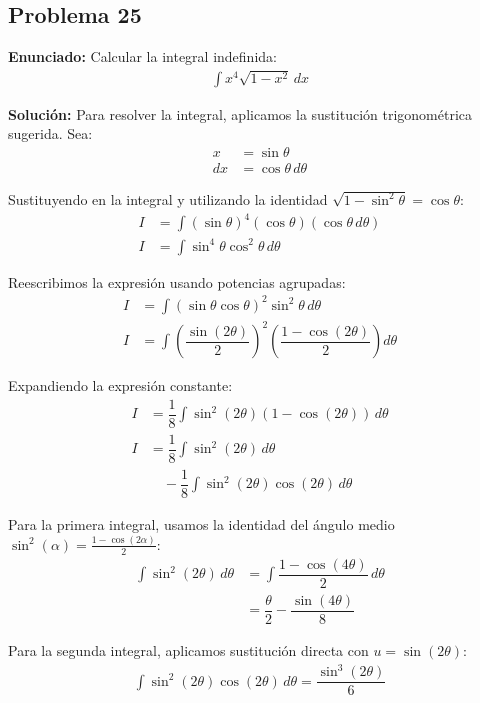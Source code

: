 \subsection*{Problema 25}

\textbf{Enunciado:}
Calcular la integral indefinida:
\begin{align*}
\int x^4 \sqrt{1 - x^2} \, dx
\end{align*}

\textbf{Solución:}
Para resolver la integral, aplicamos la sustitución trigonométrica sugerida. Sea:
\begin{align*}
x &= \sin\theta \\
dx &= \cos\theta \, d\theta
\end{align*}

Sustituyendo en la integral y utilizando la identidad $\sqrt{1 - \sin^2\theta} = \cos\theta$:
\begin{align*}
I &= \int (\sin\theta)^4 (\cos\theta) (\cos\theta \, d\theta) \\
I &= \int \sin^4\theta \cos^2\theta \, d\theta
\end{align*}

Reescribimos la expresión usando potencias agrupadas:
\begin{align*}
I &= \int (\sin\theta \cos\theta)^2 \sin^2\theta \, d\theta \\
I &= \int \left(\dfrac{\sin(2\theta)}{2}\right)^2 \left(\dfrac{1 - \cos(2\theta)}{2}\right) d\theta
\end{align*}

Expandiendo la expresión constante:
\begin{align*}
I &= \dfrac{1}{8} \int \sin^2(2\theta) (1 - \cos(2\theta)) \, d\theta \\
I &= \dfrac{1}{8} \int \sin^2(2\theta) \, d\theta \\
&\quad - \dfrac{1}{8} \int \sin^2(2\theta) \cos(2\theta) \, d\theta
\end{align*}

Para la primera integral, usamos la identidad del ángulo medio $\sin^2(\alpha) = \frac{1 - \cos(2\alpha)}{2}$:
\begin{align*}
\int \sin^2(2\theta) \, d\theta &= \int \dfrac{1 - \cos(4\theta)}{2} \, d\theta \\
&= \dfrac{\theta}{2} - \dfrac{\sin(4\theta)}{8}
\end{align*}

Para la segunda integral, aplicamos sustitución directa con $u = \sin(2\theta)$:
\begin{align*}
\int \sin^2(2\theta) \cos(2\theta) \, d\theta = \dfrac{\sin^3(2\theta)}{6}
\end{align*}

